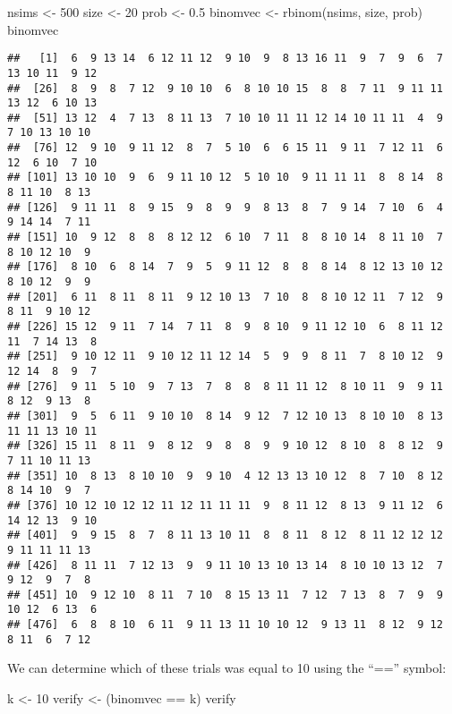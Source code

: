 \documentclass[
]{book}
\newenvironment{Shaded}{\begin{snugshade}}{\end{snugshade}}
\newcommand{\DecValTok}[1]{\textcolor[rgb]{0.00,0.00,0.81}{#1}}
\newcommand{\FloatTok}[1]{\textcolor[rgb]{0.00,0.00,0.81}{#1}}
\newcommand{\FunctionTok}[1]{\textcolor[rgb]{0.00,0.00,0.00}{#1}}
\newcommand{\NormalTok}[1]{#1}
\newcommand{\OtherTok}[1]{\textcolor[rgb]{0.56,0.35,0.01}{#1}}
\newcommand{\SpecialCharTok}[1]{\textcolor[rgb]{0.00,0.00,0.00}{#1}}
\begin{document}
\begin{Shaded}
\begin{Highlighting}[]
\NormalTok{nsims }\OtherTok{\textless{}{-}} \DecValTok{500}
\NormalTok{size }\OtherTok{\textless{}{-}} \DecValTok{20}
\NormalTok{prob }\OtherTok{\textless{}{-}} \FloatTok{0.5}
\NormalTok{binomvec }\OtherTok{\textless{}{-}} \FunctionTok{rbinom}\NormalTok{(nsims, size, prob)}
\NormalTok{binomvec}
\end{Highlighting}
\end{Shaded}

\begin{verbatim}
##   [1]  6  9 13 14  6 12 11 12  9 10  9  8 13 16 11  9  7  9  6  7 13 10 11  9 12
##  [26]  8  9  8  7 12  9 10 10  6  8 10 10 15  8  8  7 11  9 11 11 13 12  6 10 13
##  [51] 13 12  4  7 13  8 11 13  7 10 10 11 11 12 14 10 11 11  4  9  7 10 13 10 10
##  [76] 12  9 10  9 11 12  8  7  5 10  6  6 15 11  9 11  7 12 11  6 12  6 10  7 10
## [101] 13 10 10  9  6  9 11 10 12  5 10 10  9 11 11 11  8  8 14  8  8 11 10  8 13
## [126]  9 11 11  8  9 15  9  8  9  9  8 13  8  7  9 14  7 10  6  4  9 14 14  7 11
## [151] 10  9 12  8  8  8 12 12  6 10  7 11  8  8 10 14  8 11 10  7  8 10 12 10  9
## [176]  8 10  6  8 14  7  9  5  9 11 12  8  8  8 14  8 12 13 10 12  8 10 12  9  9
## [201]  6 11  8 11  8 11  9 12 10 13  7 10  8  8 10 12 11  7 12  9  8 11  9 10 12
## [226] 15 12  9 11  7 14  7 11  8  9  8 10  9 11 12 10  6  8 11 12 11  7 14 13  8
## [251]  9 10 12 11  9 10 12 11 12 14  5  9  9  8 11  7  8 10 12  9 12 14  8  9  7
## [276]  9 11  5 10  9  7 13  7  8  8  8 11 11 12  8 10 11  9  9 11  8 12  9 13  8
## [301]  9  5  6 11  9 10 10  8 14  9 12  7 12 10 13  8 10 10  8 13 11 11 13 10 11
## [326] 15 11  8 11  9  8 12  9  8  8  9  9 10 12  8 10  8  8 12  9  7 11 10 11 13
## [351] 10  8 13  8 10 10  9  9 10  4 12 13 13 10 12  8  7 10  8 12  8 14 10  9  7
## [376] 10 12 10 12 12 11 12 11 11 11  9  8 11 12  8 13  9 11 12  6 14 12 13  9 10
## [401]  9  9 15  8  7  8 11 13 10 11  8  8 11  8 12  8 11 12 12 12  9 11 11 11 13
## [426]  8 11 11  7 12 13  9  9 11 10 13 10 13 14  8 10 10 13 12  7  9 12  9  7  8
## [451] 10  9 12 10  8 11  7 10  8 15 13 11  7 12  7 13  8  7  9  9 10 12  6 13  6
## [476]  6  8  8 10  6 11  9 11 13 11 10 10 12  9 13 11  8 12  9 12  8 11  6  7 12
\end{verbatim}

We can determine which of these trials was equal to 10 using the ``=='' symbol:

\begin{Shaded}
\begin{Highlighting}[]
\NormalTok{k }\OtherTok{\textless{}{-}} \DecValTok{10}
\NormalTok{verify }\OtherTok{\textless{}{-}}\NormalTok{ (binomvec }\SpecialCharTok{==}\NormalTok{ k)}
\NormalTok{verify}
\end{Highlighting}
\end{Shaded}
\end{document}
